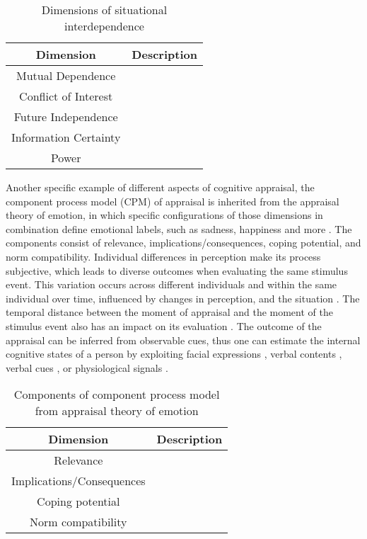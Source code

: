 \begin{table}
    \centering
    \begin{tabular}{|c|l|} \hline
        Dimension & Description\\\hline
       Mutual Dependence  & \\
       Conflict of Interest  & \\
       Future Independence  & \\
       Information Certainty  & \\
       Power  & \\ \hline
    \end{tabular}
    \caption{Dimensions of situational interdependence \cite{gerpott2017howdopeople}}
    \label{tab:sis_dimensions}
\end{table}

Another specific example of different aspects of cognitive appraisal, the component process model (CPM) of appraisal is inherited from the appraisal theory of emotion, in which specific configurations of those dimensions in combination define emotional labels, such as sadness, happiness and more \cite{sander2005systems, scherer2013nature}. The components consist of relevance, implications/consequences, coping potential, and norm compatibility. Individual differences in perception make its process subjective, which leads to diverse outcomes when evaluating the same stimulus event. This variation occurs across different individuals and within the same individual over time, influenced by changes in perception, and the situation \cite{dudzik2023valid}. The temporal distance between the moment of appraisal and the moment of the stimulus event also has an impact on its evaluation \cite{trope2003temporal}. The outcome of the appraisal can be inferred from observable cues, thus one can estimate the internal cognitive states of a person by exploiting facial expressions \cite{kaiser2001facial}, verbal contents \cite{}, verbal cues \cite{Lotfian2019building}, or physiological signals \cite{}. 


\begin{table}
    \centering
    \begin{tabular}{|c|l|} \hline
        Dimension & Description\\\hline
        Relevance  & \\
       Implications/Consequences  & \\
       Coping potential  & \\
       Norm compatibility  & \\ \hline
    \end{tabular}
    \caption{Components of component process model from appraisal theory of emotion  \cite{scherer2013nature}}
    \label{tab:emo_dimensions}
\end{table}

